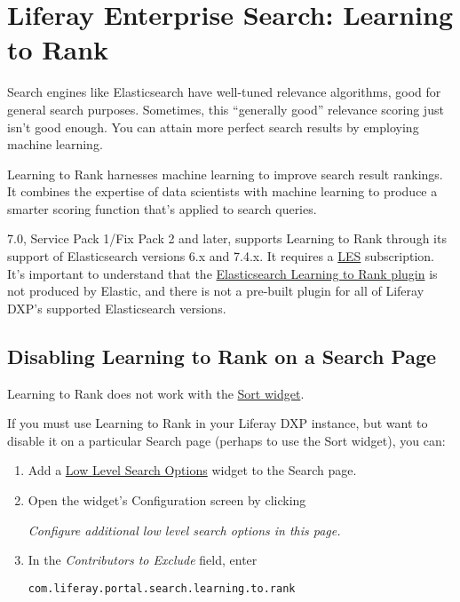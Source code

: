 \chapter{Liferay Enterprise Search: Learning to
Rank}\label{liferay-enterprise-search-learning-to-rank}

Search engines like Elasticsearch have well-tuned relevance algorithms,
good for general search purposes. Sometimes, this ``generally good''
relevance scoring just isn't good enough. You can attain more perfect
search results by employing machine learning.

Learning to Rank harnesses machine learning to improve search result
rankings. It combines the expertise of data scientists with machine
learning to produce a smarter scoring function that's applied to search
queries.

7.0, Service Pack 1/Fix Pack 2 and later, supports Learning to Rank
through its support of Elasticsearch versions 6.x and 7.4.x. It requires
a \href{https://help.liferay.com/hc/en-us/articles/360014400932}{LES}
subscription. It's important to understand that the
\href{https://elasticsearch-learning-to-rank.readthedocs.io/en/latest/index.html}{Elasticsearch
Learning to Rank plugin} is not produced by Elastic, and there is not a
pre-built plugin for all of Liferay DXP's supported Elasticsearch
versions.

\section{Disabling Learning to Rank on a Search
Page}\label{disabling-learning-to-rank-on-a-search-page}

Learning to Rank does not work with the
\href{/docs/7-2/user/-/knowledge_base/u/sorting-search-results-with-the-sort-widget}{Sort
widget}.

If you must use Learning to Rank in your Liferay DXP instance, but want
to disable it on a particular Search page (perhaps to use the Sort
widget), you can:

\begin{enumerate}
\def\labelenumi{\arabic{enumi}.}
\item
  Add a
  \href{/docs/7-2/user/-/knowledge_base/u/low-level-search-options-searching-additional-or-alternate-indexes}{Low
  Level Search Options} widget to the Search page.
\item
  Open the widget's Configuration screen by clicking

  \emph{Configure additional low level search options in this page.}
\item
  In the \emph{Contributors to Exclude} field, enter

  \texttt{com.liferay.portal.search.learning.to.rank}
\end{enumerate}

